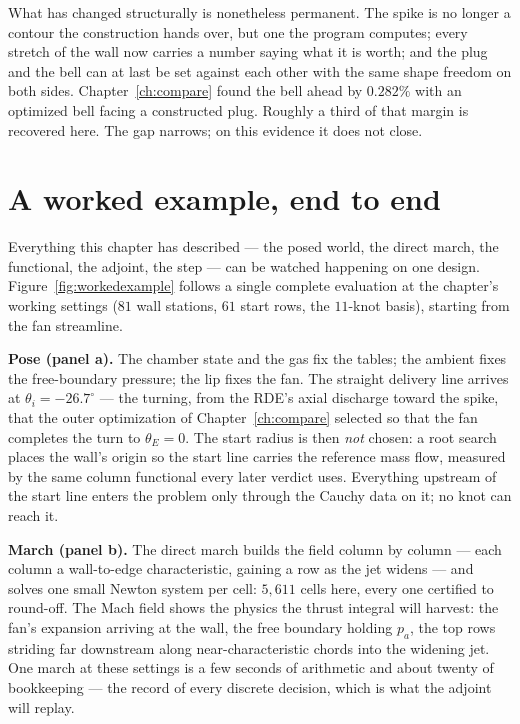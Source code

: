 What has changed structurally is nonetheless permanent. The spike is
no longer a contour the construction hands over, but one the program
computes; every stretch of the wall now carries a number saying what
it is worth; and the plug and the bell can at last be set against each
other with the same shape freedom on both sides. Chapter~\ref{ch:compare}
found the bell ahead by $0.282\%$ with an optimized bell facing a
constructed plug. Roughly a third of that margin is recovered here.
The gap narrows; on this evidence it does not close.

\section{A worked example, end to end}
\label{sec:workedexample}

Everything this chapter has described --- the posed world, the
direct march, the functional, the adjoint, the step --- can be
watched happening on one design. Figure~\ref{fig:workedexample}
follows a single complete evaluation at the chapter's working
settings ($81$ wall stations, $61$ start rows, the $11$-knot basis),
starting from the fan streamline.

\textbf{Pose (panel a).} The chamber state and the gas fix the
tables; the ambient fixes the free-boundary pressure; the lip fixes
the fan. The straight delivery line arrives at
$\theta_i = -26.7^{\circ}$ --- the turning, from the RDE's axial
discharge toward the spike, that the outer optimization of
Chapter~\ref{ch:compare} selected so that the fan completes the
turn to $\theta_E = 0$. The start radius is then \emph{not} chosen:
a root search places the wall's origin so the start line carries the
reference mass flow, measured by the same column functional every
later verdict uses. Everything upstream of the start line enters
the problem only through the Cauchy data on it; no knot can reach
it.

\textbf{March (panel b).} The direct march builds the field column
by column --- each column a wall-to-edge characteristic, gaining a
row as the jet widens --- and solves one small Newton system per
cell: $5{,}611$ cells here, every one certified to round-off. The
Mach field shows the physics the thrust integral will harvest: the
fan's expansion arriving at the wall, the free boundary holding
$p_a$, the top rows striding far downstream along near-characteristic
chords into the widening jet. One march at these settings is a few
seconds of arithmetic and about twenty of bookkeeping --- the
record of every discrete decision, which is what the adjoint will
replay.

